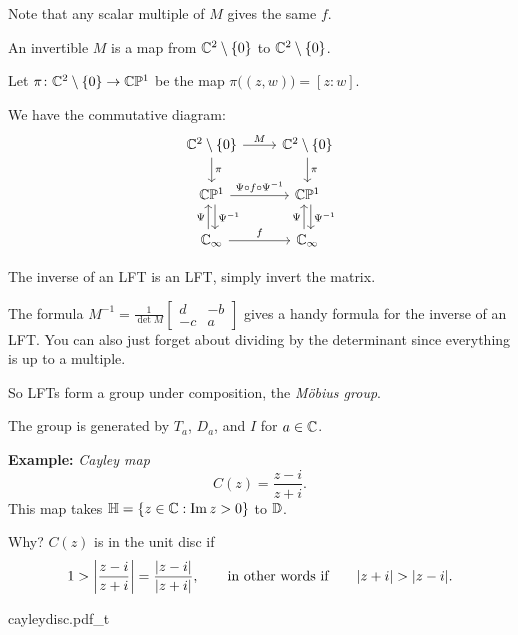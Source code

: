 \documentclass[10pt,aspectratio=169]{beamer}
\begin{document}
\begin{frame}[fragile]
Note that any scalar multiple of $M$ gives the same $f$.

\medskip
\pause

An invertible $M$ is a map from
${\mathbb{C}}^2 \setminus \{ 0 \}$ to ${\mathbb{C}}^2 \setminus \{ 0 \}$.

\pause
\medskip

Let $\pi \colon {\mathbb{C}}^2 \setminus \{ 0 \} \to {\mathbb{C}} {\mathbb{P}}^1$ be the map
$\pi \bigl( (z,w) \bigr) =
[z:w]$. 

\medskip
\pause

We have the commutative diagram:
\begin{equation*}
\begin{tikzcd}
\C^2 \setminus \{ 0 \} \arrow[r,"M"] \arrow[d,"\pi"] &
\C^2 \setminus \{ 0 \} \arrow[d,"\pi"] \\
\C \bP^1 \arrow[r,"\Psi \circ f \circ \Psi^{-1}"] \arrow[d,shift left,"\Psi^{-1}"] &
\C \bP^1 \arrow[d,shift left,"\Psi^{-1}"]
\\
\C_\infty \arrow[r,"f"]\arrow[u,shift left,"\Psi"] &
\C_\infty \arrow[u,shift left,"\Psi"]
\end{tikzcd}
\end{equation*}

\end{frame}

\begin{frame}
The inverse of an LFT is an LFT, simply invert the matrix.

\medskip
\pause

The formula $M^{-1} = \frac{1}{\det M}
\left[ \begin{smallmatrix} 
d & -b \\ -c & a
\end{smallmatrix} \right]$
gives a handy formula for the inverse
of an LFT.  You can also just forget about dividing by the determinant
since everything is up to a multiple.

\medskip
\pause

So LFTs form a group under composition,
the \emph{M\"obius group}.

\medskip
\pause

The group is generated by 
$T_a$, $D_a$, and $I$ for $a\in {\mathbb{C}}$.
\end{frame}

\begin{frame}
\textbf{Example:}
\emph{Cayley map}
\begin{equation*}
C(z)
=
\frac{z - i}{z + i} .
\end{equation*}
\pause
This map takes ${\mathbb{H}} = \{ z \in {\mathbb{C}} : \operatorname{Im} z > 0 \}$ to ${\mathbb{D}}$.

\medskip
\pause

Why?  $C(z)$ is in the unit disc if
\begin{equation*}
1 > \left\lvert {\frac{z - i}{z + i} } \right\rvert
=
\frac{\lvert {z - i} \rvert}{\lvert {z + i} \rvert} ,
\qquad \text{in other words if} \qquad
\lvert {z+i} \rvert > \lvert {z - i} \rvert .
\end{equation*}

\pause

\begin{center}
{cayleydisc.pdf_t}
\end{center}
\end{frame}
\end{document}
